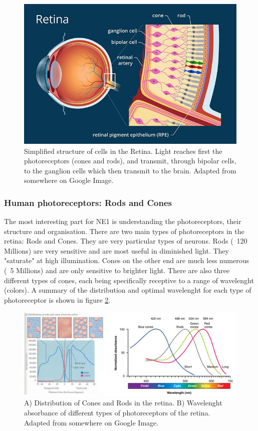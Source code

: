 \begin{figure}[H]
    \centering
    \includegraphics[width=0.7\linewidth]{../../Figures/Retina.png}
    \caption{Simplified structure of cells in the Retina. Light reaches first the photoreceptors (cones and rods), and transmit, through bipolar cells, to the ganglion cells which then transmit to the brain. Adapted from somewhere on Google Image.}
    \label{fig:Retina}
\end{figure}

\subsubsection{Human photoreceptors: Rods and Cones}

The most interesting part for NE1 is understanding the photoreceptors, their structure and organisation. There are two main types of photoreceptors in the retina: Rods and Cones. They are very particular types of neurons. Rods (~120 Millions) are very sensitive and are most useful in diminished light. They "saturate" at high illumination. Cones on the other end are much less numerous (~5 Millions) and are only sensitive to brighter light. There are also three different types of cones, each being specifically receptive to a range of wavelenght (colors). A summary of the distribution and optimal wavelenght for each type of photoreceptor is shown in figure \ref{fig:Cones_And_Rodes}.

\begin{figure}[H]
    \centering
    \includegraphics[width=0.9\linewidth]{../../Figures/Cones_And_Rodes.png}
    \caption{A) Distribution of Cones and Rods in the retina. B) Wavelenght absorbance of different types of photoreceptors of the retina. Adapted from somewhere on Google Image.}
    \label{fig:Cones_And_Rodes}
\end{figure}

